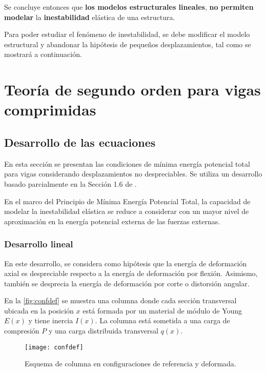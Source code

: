 Se concluye entonces que \textbf{los modelos estructurales lineales}, \textbf{no permiten modelar} la \textbf{inestabilidad} elástica de una estructura. %

Para poder estudiar el fenómeno de inestabilidad, se debe modificar el modelo estructural y abandonar la hipótesis de pequeños desplazamientos, tal como se mostrará a continuación.
 




\section{Teoría de segundo orden para vigas comprimidas}

\subsection{Desarrollo de las ecuaciones}

En esta sección se presentan las condiciones de mínima energía potencial total para vigas considerando desplazamientos no despreciables. Se utiliza un desarrollo basado parcialmente en la Sección 1.6 de \citep{yoo2011}.

En el marco del Principio de Mínima Energía Potencial Total, la capacidad de modelar la inestabilidad elástica se reduce a considerar con un mayor nivel de aproximación en la energía potencial externa de las fuerzas externas.
%

\subsubsection{Desarrollo lineal}

En este desarrollo, se considera como hipótesis que la energía de deformación axial es despreciable respecto a la energía de deformación por flexión. %
Asimismo, también se desprecia la energía de deformación por corte o distorsión angular.

En la \autoref{fig:confdef} se muestra una columna donde cada sección transversal ubicada en la posición $x$ está formada por un material de módulo de Young $E(x)$ y tiene inercia $I(x)$. La columna está sometida a una carga de compresión $P$ y una carga distribuida transversal $q(x)$.
%
\begin{figure}[htb]
	\centering
	\texttt{[image: confdef]}
	\caption{Esquema de columna en configuraciones de referencia y deformada.}
	\label{fig:confdef}
\end{figure}

